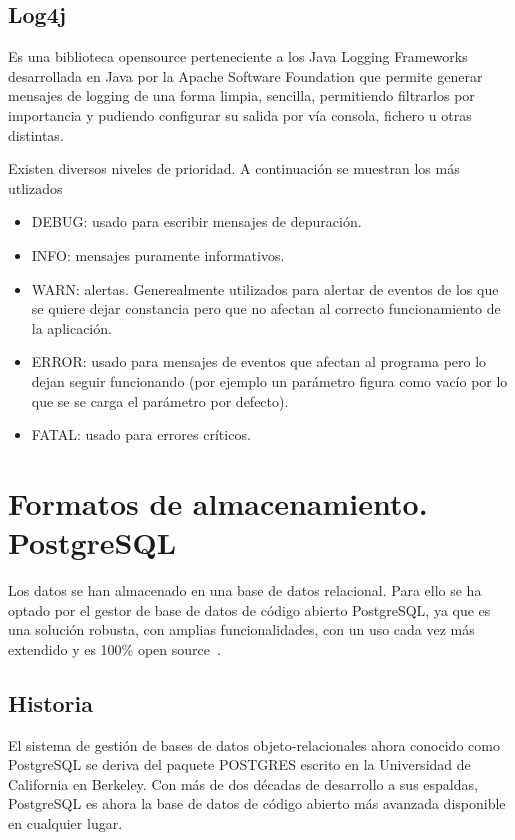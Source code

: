 \subsection{Log4j}
 Es una biblioteca \gls{opensource} perteneciente a los Java Logging Frameworks desarrollada en Java por la Apache Software Foundation que permite generar mensajes de logging de una forma limpia, sencilla, permitiendo filtrarlos por importancia y pudiendo configurar su salida por vía consola, fichero u otras distintas.
 
  Existen diversos niveles de prioridad. A continuación se muestran los más utlizados
  
\begin{itemize}
\item DEBUG: usado para escribir mensajes de depuración.
\item INFO: mensajes puramente informativos.
\item WARN: alertas. Generealmente utilizados para alertar de eventos de los que se quiere dejar constancia pero que no afectan al correcto funcionamiento de la aplicación.
\item ERROR: usado para mensajes de eventos que afectan al programa pero lo dejan seguir funcionando (por ejemplo un parámetro figura como vacío por lo que se se carga el parámetro por defecto).
\item FATAL: usado para errores críticos. 
\end{itemize}  
  
    


\section{Formatos de almacenamiento. PostgreSQL}
\label{sec:almacenamiento}

Los datos se han almacenado en una base de datos relacional. Para ello se ha optado por el gestor de base de datos de código abierto PostgreSQL, ya que es una solución robusta, con amplias funcionalidades, con un uso cada vez más extendido y es 100\% open source~\cite{PostgreSQL}.



\subsection{Historia}
\label{sec:historiapsql}

El sistema de gestión de bases de datos objeto-relacionales ahora conocido como PostgreSQL se deriva del paquete POSTGRES escrito en la Universidad de California en Berkeley. Con más de dos décadas de desarrollo a sus espaldas, PostgreSQL es ahora la base de datos de código abierto más avanzada disponible en cualquier lugar.

